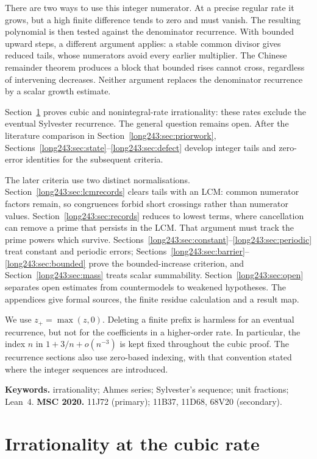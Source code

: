 There are two ways to use this integer numerator. At a precise regular
rate it grows, but a high finite difference tends to zero and must
vanish. The resulting polynomial is then tested against the denominator
recurrence. With bounded upward steps, a different argument applies:
a stable common divisor gives reduced tails, whose numerators avoid
every earlier multiplier. The Chinese remainder theorem produces a
block that bounded rises cannot cross, regardless of intervening
decreases. Neither argument replaces the denominator recurrence by a
scalar growth estimate.

Section~\ref{long243:sec:cubicrate} proves cubic and nonintegral-rate
irrationality: these rates exclude the eventual Sylvester recurrence.
The general question remains open. After the literature comparison in
Section~\ref{long243:sec:priorwork},
Sections~\ref{long243:sec:state}--\ref{long243:sec:defect} develop
integer tails and zero-error identities for the subsequent criteria.

The later criteria use two distinct normalisations.
Section~\ref{long243:sec:lcmrecords} clears tails with an LCM: common
numerator factors remain, so congruences forbid short crossings rather
than numerator values. Section~\ref{long243:sec:records} reduces to
lowest terms, where cancellation can remove a prime that persists in
the LCM. That argument must track the prime powers which survive. Sections~\ref{long243:sec:constant}--\ref{long243:sec:periodic}
treat constant and periodic errors;
Sections~\ref{long243:sec:barrier}--\ref{long243:sec:bounded} prove
the bounded-increase criterion, and Section~\ref{long243:sec:mass}
treats scalar summability. Section~\ref{long243:sec:open} separates open
estimates from countermodels to weakened hypotheses. The appendices
give formal sources, the finite residue calculation and a result map.

We use $z_+=\max(z,0)$. Deleting a finite prefix is harmless for an eventual
recurrence, but not for the coefficients in a higher-order rate. In
particular, the index $n$ in $1+3/n+o(n^{-3})$ is kept fixed throughout
the cubic proof. The recurrence sections also use zero-based indexing,
with that convention stated where the integer sequences are introduced.


\medskip
\noindent\textbf{Keywords.} irrationality; Ahmes series; Sylvester's sequence;
unit fractions; Lean~4.
\qquad
\textbf{MSC 2020.} 11J72 (primary); 11B37, 11D68, 68V20 (secondary).

\section{Irrationality at the cubic rate}\label{long243:sec:cubicrate}

